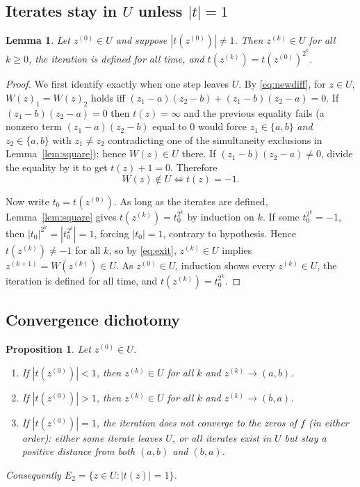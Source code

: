 \documentclass{amsart}
\newtheorem{lemma}{Lemma}
\newtheorem{proposition}{Proposition}
\theoremstyle{definition}
\theoremstyle{remark}
\begin{document}
\subsection{Iterates stay in $U$ unless $|t|=1$}

\begin{lemma}\label{lem:stayU}
Let $z^{(0)}\in U$ and suppose $|t(z^{(0)})|\neq 1$. Then $z^{(k)}\in U$ for all $k\ge 0$,
the iteration is defined for all time, and $t(z^{(k)})=t(z^{(0)})^{2^k}$.
\end{lemma}

\begin{proof}
We first identify exactly when one step leaves $U$. By \eqref{eq:newdiff}, for $z\in U$,
$W(z)_1=W(z)_2$ holds iff $(z_1-a)(z_2-b)+(z_1-b)(z_2-a)=0$. If $(z_1-b)(z_2-a)=0$ then
$t(z)=\infty$ and the previous equality fails (a nonzero term $(z_1-a)(z_2-b)$ equal to $0$
would force $z_1\in\{a,b\}$ \emph{and} $z_2\in\{a,b\}$ with $z_1\neq z_2$ contradicting one of
the simultaneity exclusions in Lemma~\ref{lem:square}); hence $W(z)\in U$ there. If
$(z_1-b)(z_2-a)\neq0$, divide the equality by it to get $t(z)+1=0$. Therefore
\begin{equation}\label{eq:exit}
W(z)\notin U \iff t(z)=-1 .
\end{equation}

Now write $t_0=t(z^{(0)})$. As long as the iterates are defined, Lemma~\ref{lem:square}
gives $t(z^{(k)})=t_0^{2^k}$ by induction on $k$. If some $t_0^{2^k}=-1$, then
$|t_0|^{2^k}=|t_0^{2^k}|=1$, forcing $|t_0|=1$, contrary to hypothesis. Hence
$t(z^{(k)})\neq-1$ for all $k$, so by \eqref{eq:exit}, $z^{(k)}\in U$ implies
$z^{(k+1)}=W(z^{(k)})\in U$. As $z^{(0)}\in U$, induction shows every $z^{(k)}\in U$, the
iteration is defined for all time, and $t(z^{(k)})=t_0^{2^k}$.
\end{proof}

\subsection{Convergence dichotomy}

\begin{proposition}\label{prop:dichotomy}
Let $z^{(0)}\in U$.
\begin{enumerate}
\item If $|t(z^{(0)})|<1$, then $z^{(k)}\in U$ for all $k$ and $z^{(k)}\to(a,b)$.
\item If $|t(z^{(0)})|>1$, then $z^{(k)}\in U$ for all $k$ and $z^{(k)}\to(b,a)$.
\item If $|t(z^{(0)})|=1$, the iteration does not converge to the zeros of $f$
(in either order): either some iterate leaves $U$, or all iterates exist in $U$ but stay a
positive distance from both $(a,b)$ and $(b,a)$.
\end{enumerate}
Consequently $E_2=\{z\in U:|t(z)|=1\}$.
\end{proposition}
\end{document}
